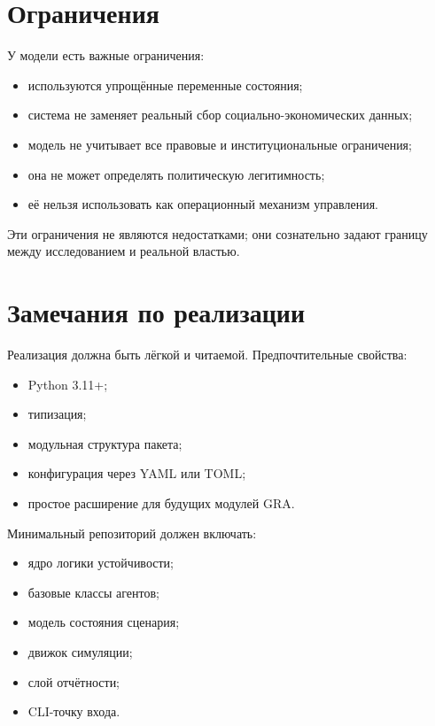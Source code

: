 \documentclass[11pt,a4paper]{article}
\begin{document}
\section{Ограничения}

У модели есть важные ограничения:

\begin{itemize}[leftmargin=1.5em]
    \item используются упрощённые переменные состояния;
    \item система не заменяет реальный сбор социально-экономических данных;
    \item модель не учитывает все правовые и институциональные ограничения;
    \item она не может определять политическую легитимность;
    \item её нельзя использовать как операционный механизм управления.
\end{itemize}

Эти ограничения не являются недостатками; они сознательно задают границу между исследованием и реальной властью.

\section{Замечания по реализации}

Реализация должна быть лёгкой и читаемой. Предпочтительные свойства:

\begin{itemize}[leftmargin=1.5em]
    \item Python 3.11+;
    \item типизация;
    \item модульная структура пакета;
    \item конфигурация через YAML или TOML;
    \item простое расширение для будущих модулей GRA.
\end{itemize}

Минимальный репозиторий должен включать:
\begin{itemize}[leftmargin=1.5em]
    \item ядро логики устойчивости;
    \item базовые классы агентов;
    \item модель состояния сценария;
    \item движок симуляции;
    \item слой отчётности;
    \item CLI-точку входа.
\end{itemize}
\end{document}
